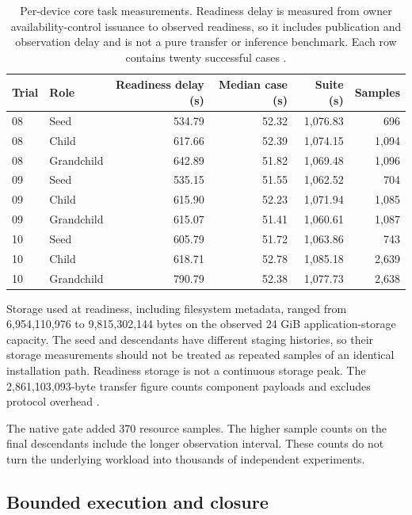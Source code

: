 \documentclass[11pt,letterpaper]{article}
\begin{document}
\begin{table}[htbp]
\centering\small
\caption{Per-device core task measurements. Readiness delay is measured from
owner availability-control issuance to observed readiness, so it includes
publication and observation delay and is not a pure transfer or inference
benchmark. Each row contains twenty successful cases \cite{measurements}.}
\label{tab:devices}
\begin{tabular}{@{}llrrrr@{}}
\toprule
Trial & Role & Readiness delay (s) & Median case (s) & Suite (s) & Samples\\
\midrule
08 & Seed & 534.79 & 52.32 & 1,076.83 & 696\\
08 & Child & 617.66 & 52.39 & 1,074.15 & 1,094\\
08 & Grandchild & 642.89 & 51.82 & 1,069.48 & 1,096\\
09 & Seed & 535.15 & 51.55 & 1,062.52 & 704\\
09 & Child & 615.90 & 52.23 & 1,071.94 & 1,085\\
09 & Grandchild & 615.07 & 51.41 & 1,060.61 & 1,087\\
10 & Seed & 605.79 & 51.72 & 1,063.86 & 743\\
10 & Child & 618.71 & 52.78 & 1,085.18 & 2,639\\
10 & Grandchild & 790.79 & 52.38 & 1,077.73 & 2,638\\
\bottomrule
\end{tabular}
\end{table}

Storage used at readiness, including filesystem metadata, ranged from
6,954,110,976 to 9,815,302,144 bytes on the observed 24 GiB application-storage
capacity. The seed and descendants have different staging histories, so their
storage measurements should not be treated as repeated samples of an identical
installation path. Readiness storage is not a continuous storage peak. The
2,861,103,093-byte transfer figure counts component payloads and excludes
protocol overhead \cite{measurements,recovery}.

The native gate added 370 resource samples. The higher sample counts on the
final descendants include the longer observation interval. These counts do not
turn the underlying workload into thousands of independent experiments.

\subsection{Bounded execution and closure}
\end{document}
